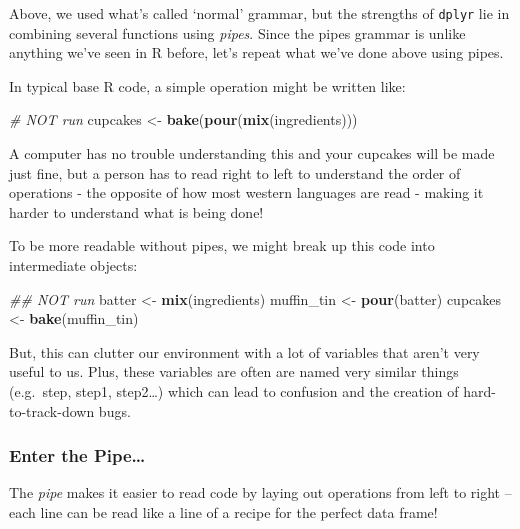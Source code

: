 \documentclass[]{book}
\newenvironment{Shaded}{\begin{snugshade}}{\end{snugshade}}
\newcommand{\CommentTok}[1]{\textcolor[rgb]{0.56,0.35,0.01}{\textit{#1}}}
\newcommand{\KeywordTok}[1]{\textcolor[rgb]{0.13,0.29,0.53}{\textbf{#1}}}
\newcommand{\NormalTok}[1]{#1}
\newcommand{\StringTok}[1]{\textcolor[rgb]{0.31,0.60,0.02}{#1}}
\begin{document}
Above, we used what's called `normal' grammar, but the strengths of \texttt{dplyr} lie in combining several functions using \emph{pipes}. Since the pipes grammar is unlike anything we've seen in R before, let's repeat what we've done above using pipes.

In typical base R code, a simple operation might be written like:

\begin{Shaded}
\begin{Highlighting}[]
\CommentTok{# NOT run}
\NormalTok{cupcakes <-}\StringTok{ }\KeywordTok{bake}\NormalTok{(}\KeywordTok{pour}\NormalTok{(}\KeywordTok{mix}\NormalTok{(ingredients)))}
\end{Highlighting}
\end{Shaded}

A computer has no trouble understanding this and your cupcakes will be made just fine, but a person has to read right to left to understand the order of operations - the opposite of how most western languages are read - making it harder to understand what is being done!

To be more readable without pipes, we might break up this code into intermediate objects:

\begin{Shaded}
\begin{Highlighting}[]
\CommentTok{## NOT run}
\NormalTok{batter <-}\StringTok{ }\KeywordTok{mix}\NormalTok{(ingredients)}
\NormalTok{muffin_tin <-}\StringTok{ }\KeywordTok{pour}\NormalTok{(batter)}
\NormalTok{cupcakes <-}\StringTok{ }\KeywordTok{bake}\NormalTok{(muffin_tin)}
\end{Highlighting}
\end{Shaded}

But, this can clutter our environment with a lot of variables that aren't very useful to us. Plus, these variables are often are named very similar things (e.g.~step, step1, step2\ldots{}) which can lead to confusion and the creation of hard-to-track-down bugs.

\hypertarget{enter-the-pipe}{%
\subsubsection*{Enter the Pipe\ldots{}}\label{enter-the-pipe}}

The \emph{pipe} makes it easier to read code by laying out operations from left to right -- each line can be read like a line of a recipe for the perfect data frame!
\end{document}
